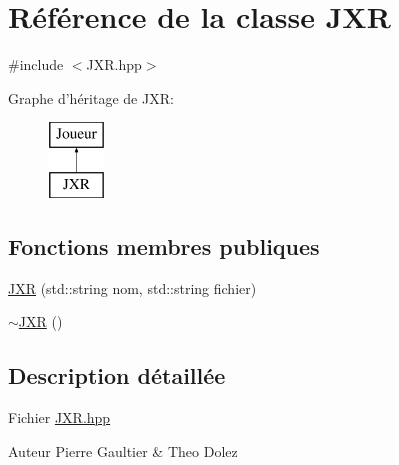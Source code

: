 \hypertarget{class_j_x_r}{\section{Référence de la classe J\-X\-R}
\label{class_j_x_r}
}


{\ttfamily \#include $<$J\-X\-R.\-hpp$>$}

Graphe d'héritage de J\-X\-R\-:\begin{figure}[H]
\begin{center}
\leavevmode
\includegraphics[height=2.000000cm]{class_j_x_r}
\end{center}
\end{figure}
\subsection*{Fonctions membres publiques}
\begin{DoxyCompactItemize}
\item 
\hyperlink{class_j_x_r_aae0980eb175a7241780f7b356bfc225f}{J\-X\-R} (std\-::string nom, std\-::string fichier)
\item 
\hyperlink{class_j_x_r_ab45417fe9d5e2460b6fdfd650692c2e1}{$\sim$\-J\-X\-R} ()
\end{DoxyCompactItemize}


\subsection{Description détaillée}
Fichier \hyperlink{_j_x_r_8hpp}{J\-X\-R.\-hpp} \begin{DoxyAuthor}{Auteur}
Pierre Gaultier \& Theo Dolez 
\end{DoxyAuthor}


